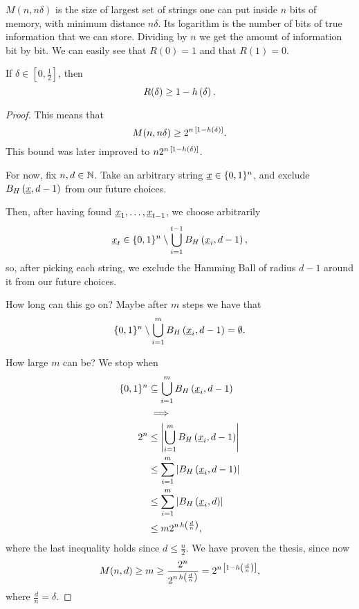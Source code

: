 $M(n, n \delta)$ is the size of largest set of strings one can put inside $n$ bits of memory, with minimum distance $n \delta$.
Its logarithm is the number of bits of true information that we can store.
Dividing by $n$ we get the amount of information bit by bit.
We can easily see that $R(0) = 1$ and that $R(1) = 0$.

\begin{thm} \label{thm:gilbert-varshamov}
	If $\delta \in \left[ 0, \frac{1}{2} \right]$, then
	\begin{equation*}
		R(\delta) \ge 1 - h\left({\delta}\right).
	\end{equation*}
\end{thm}

\begin{proof}
	This means that
	\begin{equation*}
		M(n, n \delta) \ge 2^{n \, \left[1 - h\left({\delta}\right) \right]}.
	\end{equation*}
	This bound was later improved to $n 2^{n \, \left[1 - h\left({\delta}\right) \right]}$.

	For now, fix $n, d \in \mathbb{N}$.
	Take an arbitrary string $\underline{x} \in \{0, 1\}^n$, and exclude $B_H\left(\underline{x}, d-1\right)$ from our future choices.

	Then, after having found $\underline{x}_1, \dots, \underline{x}_{t-1}$, we choose arbitrarily
	\begin{equation*}
		\underline{x}_t \in \{0, 1\}^n \setminus \bigcup_{i = 1}^{t-1} B_H\left(\underline{x}_i, d-1\right),
	\end{equation*}
	so, after picking each string, we exclude the Hamming Ball of radius $d-1$ around it from our future choices.

	How long can this go on?
	Maybe after $m$ steps we have that
	\begin{equation*}
		\{0, 1\}^n \setminus \bigcup_{i = 1}^{m} B_H\left(\underline{x}_i, d-1\right) = \emptyset.
	\end{equation*}

	How large $m$ can be?
	We stop when 
	\begin{align*}
		\{0, 1\}^n
		& \subseteq
		\bigcup_{i = 1}^{m} B_H\left(\underline{x}_i, d-1\right)
		\\
		& \implies
		\\
		2^n
		& \le
		\left|{\bigcup_{i = 1}^{m} B_H\left(\underline{x}_i, d-1\right)}\right|
		\\
		& \le
		\sum_{i = 1}^m \left|{B_H\left(\underline{x}_i, d-1\right)}\right|
		\\
		& \le
		\sum_{i = 1}^m \left|{B_H\left(\underline{x}_i, d\right)}\right|
		\\
		& \le
		m 2^{n \, h\left({\frac{d}{n}}\right)},
	\end{align*}
	where the last inequality holds since $d \le \frac{n}{2}$.
	We have proven the thesis, since now
	\begin{equation*}
		M(n, d) \ge m \ge \frac{2^n}{2^{n \, h\left({\frac{d}{n}}\right)}}
		=
		2^{n \, \left[ 1 - h\left({\frac{d}{n}}\right) \right]},
	\end{equation*}
	where $\frac{d}{n} = \delta.$
\end{proof}

